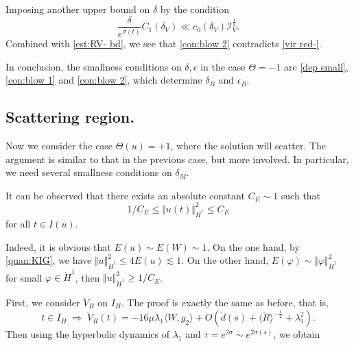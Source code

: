 \documentclass[reqno, 11pt]{amsart}
\numberwithin{equation}{section}
\theoremstyle{plain}
\theoremstyle{definition}
\numberwithin{equation}{section}
\numberwithin{theorem}{section}
\numberwithin{equation}{section}
\numberwithin{equation}{section}
\numberwithin{theorem}{section}
\begin{document}
	Imposing another upper bound on $\delta$ by the condition
	\begin{equation}\label{con:blow 2}
	\frac{\delta}{e^{\sigma(t)}} C_{1}(\delta_{V}) \ll c_0(\delta_{V})\mathcal{I}_V^{\frac12}.
	\end{equation}
	Combined with \eqref{est:RV- bd}, we see that \eqref{con:blow 2} contradicts \eqref{vir red-}.
	
	In conclusion, the smallness conditions on $\delta,\epsilon$ in the case $\Theta=-1$ are \eqref{dep small}, \eqref{con:blow 1} and  \eqref{con:blow 2}, which determine $\delta_{B}$ and $\epsilon_{B}$.
	
	
	
	\subsection{Scattering region.} Now we consider the case $\Theta(u)=+1$, where the solution will scatter. The argument is similar to that in the previous case, but more involved. In particular, we need several smallness conditions on $\delta_{M}$.
	
	It can be observed that there exists an absolute constant $C_E \sim 1$ such that
	\begin{equation}\label{est:H1 bd}
	1/C_E \leq \Vert u(t) \Vert_{\dot H^1}^2 \leq C_E
	\end{equation}
	for all $t\in I(u)$.
	
	Indeed, it is obvious that $E(u)\sim E(W)\sim 1$. On the one hand, by \eqref{quan:KIG}, we have $\Vert u\Vert_{\dot H^1}^2\leq4E(u)\lesssim1$. On the other hand, $E(\varphi)\sim \Vert \varphi \Vert_{\dot H^1}^2$ for small $\varphi \in \dot H^1$, then $\Vert u \Vert_{\dot H^1}^2\geq1/C_E $.
	
	First, we consider $\ddot{V}_R$ on $I_H$. The proof is exactly the same as before, that is, 
	\begin{equation*}
	t\in I_H\;\Longrightarrow \;\ddot{V}_R(t)=-16\mu\lambda_{1} \langle W,g_2\rangle+O\left( \widetilde{d}(s)+\langle \widetilde{R} \rangle^{-\frac{1}{2}}+\lambda_{1}^2 \right).
	\end{equation*}
	Then using the hyperbolic dynamics of $\lambda_{1}$ and $\dot{\tau}=e^{2\sigma}\sim e^{2\sigma(s)}$, we obtain
	
\end{document}
